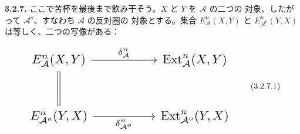 \medskip\noindent\textbf{3.2.7.}\quad
ここで苦杯を最後まで飲み干そう。$X$ と $Y$ を $\mathcal A$ の二つの
対象、したがって $\mathcal A^o$、すなわち $\mathcal A$ の反対圏の
対象とする。集合 $E_{\mathcal A}^{n}(X,Y)$ と
$E_{\mathcal A^o}^{n}(Y,X)$ は等しく、二つの写像がある：

\begin{equation}
\resizebox{0.74\textwidth}{!}{%
$\begin{tikzcd}[ampersand replacement=\&,column sep=5.0em,row sep=2.8em]
E_{\mathcal A}^{n}(X,Y)
  \arrow[r,"{\delta_{\mathcal A}^{n}}"]
  \arrow[d,equal]
\& \operatorname{Ext}_{\mathcal A}^{n}(X,Y) \\
E_{\mathcal A^o}^{n}(Y,X)
  \arrow[r,"{\delta_{\mathcal A^o}^{n}}"']
\& \operatorname{Ext}_{\mathcal A^o}^{n}(Y,X)
\end{tikzcd}$%
}
\tag{3.2.7.1}
\end{equation}
\endgroup
